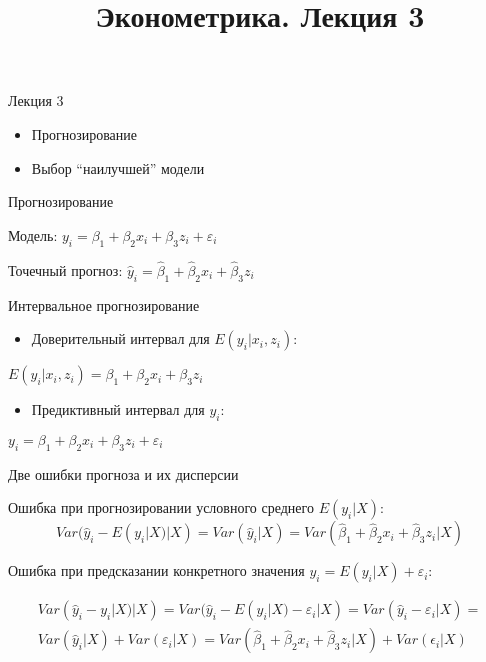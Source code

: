 \documentclass[ignorenonframetext,]{beamer}
\title{Эконометрика. Лекция 3}
\begin{document}
\frame{\titlepage}

\begin{frame}{Лекция 3}

\begin{itemize}
\item
  Прогнозирование
\item
  Выбор ``наилучшей'' модели
\end{itemize}

\end{frame}

\begin{frame}{Прогнозирование}

Модель: $y_i = \beta_1 + \beta_2 x_i + \beta_3 z_i + \varepsilon_i$

Точечный прогноз:
$\hat{y}_i = \hat{\beta}_1 +\hat{\beta}_2 x_i + \hat{\beta}_3 z_i$

\end{frame}

\begin{frame}{Интервальное прогнозирование}

\begin{itemize}
\itemsep1pt\parskip0pt
\item
  Доверительный интервал для $E(y_i | x_i, z_i)$:
\end{itemize}

$E(y_i | x_i, z_i)=\beta_1 + \beta_2 x_i + \beta_3 z_i$

\begin{itemize}
\itemsep1pt\parskip0pt
\item
  Предиктивный интервал для $y_i$:
\end{itemize}

$y_i= \beta_1 + \beta_2 x_i + \beta_3 z_i + \varepsilon_i$

\end{frame}

\begin{frame}{Две ошибки прогноза и их дисперсии}

Ошибка при прогнозировании условного среднего $E(y_i | X)$: \[
Var(\hat{y}_i - E(y_i | X) | X )=Var(\hat{y}_i | X) = Var(\hat{\beta}_1 +\hat{\beta}_2 x_i + \hat{\beta}_3 z_i | X)
\]

Ошибка при предсказании конкретного значения
$y_i = E(y_i | X) + \varepsilon_i$:

\begin{multline} \nonumber
Var(\hat{y}_i - y_i | X) | X )=Var(\hat{y}_i - E(y_i | X) - \varepsilon_i | X) = Var(\hat{y}_i - \varepsilon_i | X) = \\
Var(\hat{y}_i|X) + Var( \varepsilon_i | X) = Var(\hat{\beta}_1 +\hat{\beta}_2 x_i + \hat{\beta}_3 z_i | X) + Var(\epsilon_i | X)
\end{multline}

\end{frame}
\end{document}
